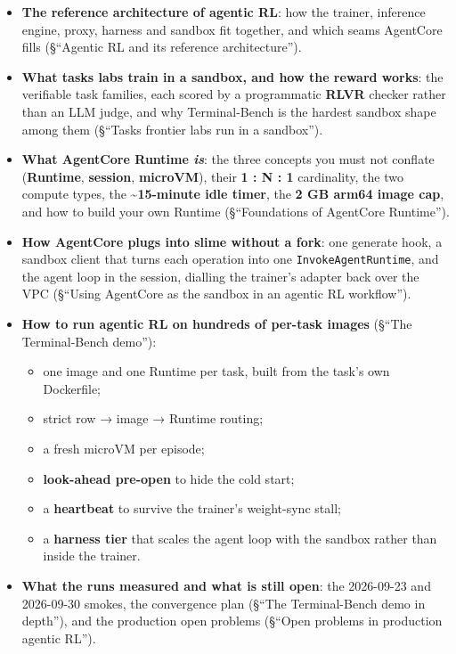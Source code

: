 \documentclass[
  paper=a4,
  ,captions=tableheading
]{scrartcl}
\providecommand{\tightlist}{%
  \setlength{\itemsep}{0pt}\setlength{\parskip}{0pt}}
\begin{document}
\begin{itemize}
\tightlist
\item
  \textbf{The reference architecture of agentic RL}: how the trainer,
  inference engine, proxy, harness and sandbox fit together, and which
  seams AgentCore fills (§``Agentic RL and its reference
  architecture'').
\item
  \textbf{What tasks labs train in a sandbox, and how the reward works}:
  the verifiable task families, each scored by a programmatic
  \textbf{RLVR} checker rather than an LLM judge, and why Terminal-Bench
  is the hardest sandbox shape among them (§``Tasks frontier labs run in
  a sandbox'').
\item
  \textbf{What AgentCore Runtime \emph{is}}: the three concepts you must
  not conflate (\textbf{Runtime}, \textbf{session}, \textbf{microVM}),
  their \textbf{1 : N : 1} cardinality, the two compute types, the
  \textbf{\textasciitilde15-minute idle timer}, the \textbf{2 GB arm64
  image cap}, and how to build your own Runtime (§``Foundations of
  AgentCore Runtime'').
\item
  \textbf{How AgentCore plugs into slime without a fork}: one generate
  hook, a sandbox client that turns each operation into one
  \texttt{InvokeAgentRuntime}, and the agent loop in the session,
  dialling the trainer's adapter back over the VPC (§``Using AgentCore
  as the sandbox in an agentic RL workflow'').
\item
  \textbf{How to run agentic RL on hundreds of per-task images} (§``The
  Terminal-Bench demo''):

  \begin{itemize}
  \tightlist
  \item
    one image and one Runtime per task, built from the task's own
    Dockerfile;
  \item
    strict row → image → Runtime routing;
  \item
    a fresh microVM per episode;
  \item
    \textbf{look-ahead pre-open} to hide the cold start;
  \item
    a \textbf{heartbeat} to survive the trainer's weight-sync stall;
  \item
    a \textbf{harness tier} that scales the agent loop with the sandbox
    rather than inside the trainer.
  \end{itemize}
\item
  \textbf{What the runs measured and what is still open}: the 2026-09-23
  and 2026-09-30 smokes, the convergence plan (§``The Terminal-Bench
  demo in depth''), and the production open problems (§``Open problems
  in production agentic RL'').
\end{itemize}
\end{document}
